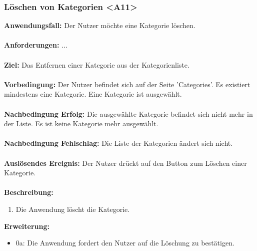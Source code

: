 \documentclass[parskip=full]{scrartcl} %
\begin{document}
\subsubsection*{Löschen von Kategorien <A11>}
\textbf{Anwendungsfall:} Der Nutzer möchte eine Kategorie löschen.\\\\
\textbf{Anforderungen:} ...\\\\
\textbf{Ziel:} Das Entfernen einer Kategorie aus der Kategorienliste.\\\\
\textbf{Vorbedingung:} Der Nutzer befindet sich auf der Seite 'Categories'. Es existiert mindestens eine Kategorie. Eine Kategorie ist ausgewählt.\\\\
\textbf{Nachbedingung Erfolg:} Die ausgewählte Kategorie befindet sich nicht mehr in der Liste. Es ist keine Kategorie mehr ausgewählt.\\\\
\textbf{Nachbedingung Fehlschlag:} Die Liste der Kategorien ändert sich nicht.\\\\
\textbf{Auslösendes Ereignis:} Der Nutzer drückt auf den Button zum Löschen einer Kategorie. \\\\
\textbf{Beschreibung:}
\begin{enumerate}
    \item Die Anwendung löscht die Kategorie.
\end{enumerate}
\textbf{Erweiterung:}
\begin{itemize}
    \item 0a: Die Anwendung fordert den Nutzer auf die Löschung zu bestätigen.
\end{itemize}
\newpage
\end{document}
